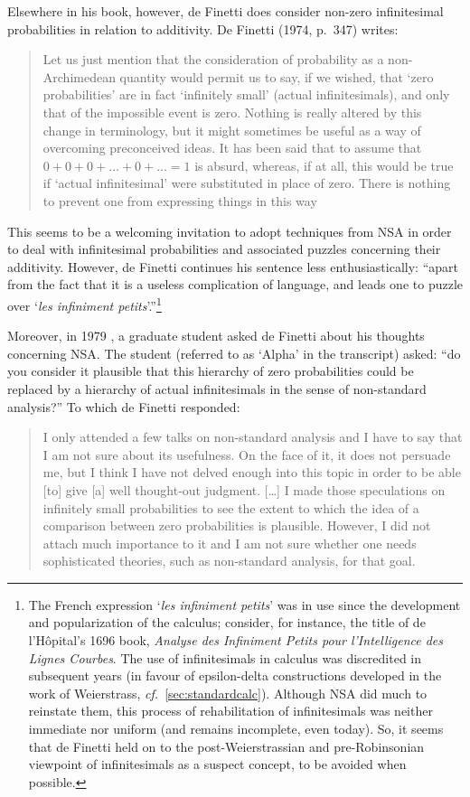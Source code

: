 Elsewhere in his book, however, de Finetti does consider non-zero infinitesimal probabilities in relation to additivity.
De Finetti (1974, p.~347) writes:
\begin{quote}
Let us just mention that the consideration of probability as a non-Archimedean quantity would permit us to say, if we wished, that `zero probabilities' are in fact `infinitely small' (actual infinitesimals), and only that of the impossible event is zero. Nothing is really altered by this change in terminology, but it might sometimes be useful as a way of overcoming preconceived ideas. It has been said that to assume that $0+0+0+ \ldots +0+ \ldots =1$ is absurd, whereas, if at all, this would be true if `actual infinitesimal' were substituted in place of zero. There is nothing to prevent one from expressing things in this way
\end{quote}
This seems to be a welcoming invitation to adopt techniques from NSA in order to deal with infinitesimal probabilities and associated puzzles concerning their additivity. However, de Finetti continues his sentence less enthusiastically:
``apart from the fact that it is a useless complication of language, and leads one to puzzle over `\textit{les infiniment petits}'.''\footnote{The French expression `\textit{les infiniment petits}' was in use since the development and popularization of the calculus; consider, for instance, the title of de l'H{\^o}pital's 1696 book, \textit{Analyse des Infiniment Petits pour l'Intelligence des Lignes Courbes}. The use of infinitesimals in calculus was discredited in subsequent years (in favour of epsilon-delta constructions developed in the work of Weierstrass, \textit{cf.}\ \autoref{sec:standardcalc}). Although NSA did much to reinstate them, this process of rehabilitation of infinitesimals was neither immediate nor uniform (and remains incomplete, even today). So, it seems that de Finetti held on to the post-Weierstrassian and pre-Robinsonian viewpoint of infinitesimals as a suspect concept, to be avoided when possible.}

Moreover, in 1979 \citep[as transcribed in][Ch.~12, p.~122]{deFinetti:2008}, a graduate student asked de Finetti about his thoughts concerning NSA. The student (referred to as `Alpha' in the transcript) asked: ``do you consider it plausible that this hierarchy of zero probabilities could be replaced by a hierarchy of actual infinitesimals in the sense of non-standard analysis?'' To which de Finetti responded:
\begin{quote}
I only attended a few talks on non-standard analysis and I have to say that I am not sure about its usefulness. On the face of it, it does not persuade me, but I think I have not delved enough into this topic in order to be able [to] give [a] well thought-out judgment. [\ldots] I made those speculations on infinitely small probabilities to see the extent to which the idea of a comparison between zero probabilities is plausible. However, I did not attach much importance to it and I am not sure whether one needs sophisticated theories, such as non-standard analysis, for that goal.
\end{quote}

